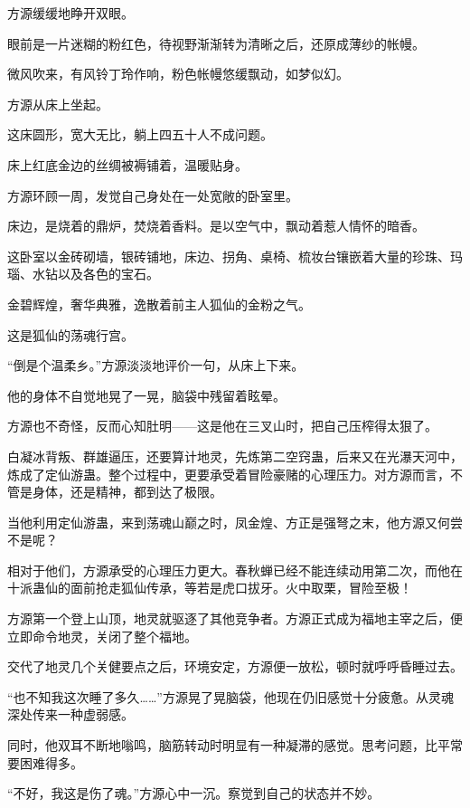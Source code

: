 
\begin{this_body}

方源缓缓地睁开双眼。

眼前是一片迷糊的粉红色，待视野渐渐转为清晰之后，还原成薄纱的帐幔。

微风吹来，有风铃丁玲作响，粉色帐幔悠缓飘动，如梦似幻。

方源从床上坐起。

这床圆形，宽大无比，躺上四五十人不成问题。

床上红底金边的丝绸被褥铺着，温暖贴身。

方源环顾一周，发觉自己身处在一处宽敞的卧室里。

床边，是烧着的鼎炉，焚烧着香料。是以空气中，飘动着惹人情怀的暗香。

这卧室以金砖砌墙，银砖铺地，床边、拐角、桌椅、梳妆台镶嵌着大量的珍珠、玛瑙、水钻以及各色的宝石。

金碧辉煌，奢华典雅，逸散着前主人狐仙的金粉之气。

这是狐仙的荡魂行宫。

“倒是个温柔乡。”方源淡淡地评价一句，从床上下来。

他的身体不自觉地晃了一晃，脑袋中残留着眩晕。

方源也不奇怪，反而心知肚明——这是他在三叉山时，把自己压榨得太狠了。

白凝冰背叛、群雄逼压，还要算计地灵，先炼第二空窍蛊，后来又在光瀑天河中，炼成了定仙游蛊。整个过程中，更要承受着冒险豪赌的心理压力。对方源而言，不管是身体，还是精神，都到达了极限。

当他利用定仙游蛊，来到荡魂山巅之时，凤金煌、方正是强弩之末，他方源又何尝不是呢？

相对于他们，方源承受的心理压力更大。春秋蝉已经不能连续动用第二次，而他在十派蛊仙的面前抢走狐仙传承，等若是虎口拔牙。火中取栗，冒险至极！

方源第一个登上山顶，地灵就驱逐了其他竞争者。方源正式成为福地主宰之后，便立即命令地灵，关闭了整个福地。

交代了地灵几个关健要点之后，环境安定，方源便一放松，顿时就呼呼昏睡过去。

“也不知我这次睡了多久……”方源晃了晃脑袋，他现在仍旧感觉十分疲惫。从灵魂深处传来一种虚弱感。

同时，他双耳不断地嗡鸣，脑筋转动时明显有一种凝滞的感觉。思考问题，比平常要困难得多。

“不好，我这是伤了魂。”方源心中一沉。察觉到自己的状态并不妙。


\end{this_body}
